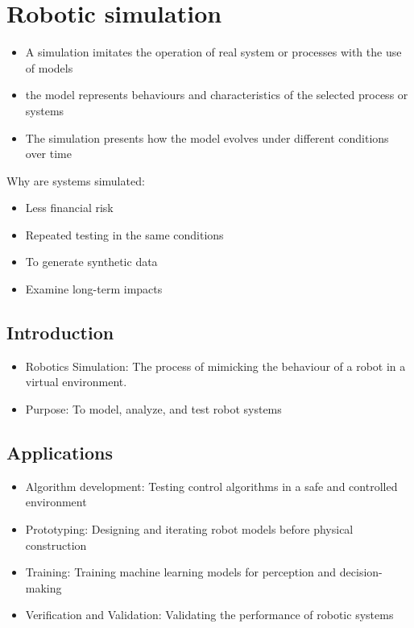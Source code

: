 
\chapter{Robotic simulation}

{
    \begin{itemize}
            \item A simulation imitates the operation of real system or processes with the use of models
            \item the model represents behaviours and characteristics of the selected process or systems
            \item The simulation presents how the model evolves under different conditions over time
    \end{itemize}
    Why are systems simulated:
    \begin{itemize}
            \item Less financial risk
            \item Repeated testing in the same conditions
            \item To generate synthetic data
            \item Examine long-term impacts
    \end{itemize}
}

\section{Introduction}
\begin{itemize}
        \item Robotics Simulation: The process of mimicking the behaviour of a robot in a virtual environment.
        \item Purpose: To model, analyze, and test robot systems
        
\end{itemize}
\section{Applications}
\begin{itemize}
        \item Algorithm development: Testing control algorithms in a safe and controlled environment
        \item Prototyping: Designing and iterating robot models before physical construction
        \item Training: Training machine learning models for perception and decision-making
        \item Verification and Validation: Validating the performance of robotic systems
\end{itemize}

